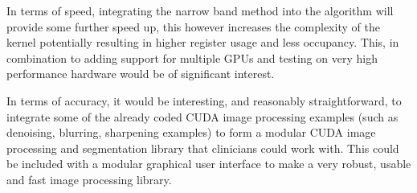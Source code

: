 In terms of speed, integrating the narrow band method into the algorithm will provide some further speed up, this however increases the complexity of the kernel potentially resulting in higher register usage and less occupancy. This, in combination to adding support for multiple GPUs and testing on very high performance hardware would be of significant interest. 

In terms of accuracy, it would be interesting, and reasonably straightforward, to integrate some of the already coded CUDA image processing examples (such as denoising, blurring, sharpening examples) to form a modular CUDA image processing and segmentation library that clinicians could work with. This could be included with a modular graphical user interface to make a very robust, usable and fast image processing library.